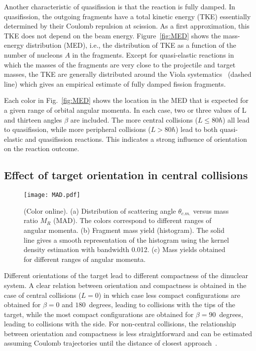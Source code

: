 \documentclass[reprint,aps,prc,twocolumn,floatfix,10pt]{revtex4-2}
\begin{document}
Another characteristic of quasifission is that the reaction is fully damped.
In quasifission, the outgoing fragments have a total kinetic energy (TKE) essentially determined by their Coulomb repulsion at scission.
As a first approximation, this TKE does not depend on the beam energy.
Figure~\ref{fig:MED} shows the mass-energy distribution (MED), i.e., the distribution of TKE as a function of the number of nucleons $A$ in the fragments.
Except for quasi-elastic reactions in which the masses of the fragments are very close to the projectile and target masses, the TKE are generally distributed around the Viola systematics~\cite{viola1985,hinde1987} (dashed line) which gives an empirical estimate of fully damped fission fragments.

Each color in Fig.~\ref{fig:MED} shows the location in the MED that is expected for a given range of orbital angular momenta. In each case, two or three values of L and thirteen angles $\beta$  are included.
The more central collisions ($L\le80 \hbar$) all lead to quasifission, while more peripheral collisions ($L>80\hbar$) lead to both quasi-elastic and quasifission reactions.
This indicates a strong influence of  orientation on the reaction outcome.

\subsection{Effect of target orientation in central collisions}
\begin{figure}[!htb]
\texttt{[image: MAD.pdf]}
\caption{\protect(Color online). (a) Distribution of scattering angle $\theta_{c.m.}$ versus mass ratio $M_R$ (MAD). The colors correspond to different ranges of angular momenta. (b) Fragment mass yield (histogram). The solid line gives a smooth representation of the histogram using the kernel density estimation with bandwidth 0.012. (c) Mass yields obtained for different ranges of angular momenta.}
\label{fig:MAD}
\end{figure}

Different orientations of the target lead to different compactness of the dinuclear system.
A clear relation between orientation and compactness is obtained in the case of central collisions ($L=0$) in which case less compact configurations are obtained for $\beta=0$ and $180$~degrees, leading to collisions with the tips of the target, while the most compact configurations are obtained for $\beta=90$~degrees, leading to collisions with the side.
For non-central collisions, the relationship between orientation and compactness is less straightforward and can be estimated assuming Coulomb trajectories until the distance of closest approach~\cite{wakhle2014}.
\end{document}
